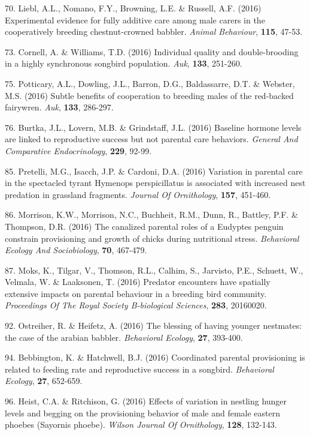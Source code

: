 70. Liebl, A.L., Nomano, F.Y., Browning, L.E. \&  Russell, A.F. (2016) Experimental evidence for fully additive care among male carers in the cooperatively breeding chestnut-crowned babbler. \textit{Animal Behaviour},  \textbf{115}, 47-53.

73. Cornell, A. \&  Williams, T.D. (2016) Individual quality and double-brooding in a highly synchronous songbird population. \textit{Auk},  \textbf{133}, 251-260.

75. Potticary, A.L., Dowling, J.L., Barron, D.G., Baldassarre, D.T. \&  Webster, M.S. (2016) Subtle benefits of cooperation to breeding males of the red-backed fairywren. \textit{Auk},  \textbf{133}, 286-297.

76. Burtka, J.L., Lovern, M.B. \&  Grindstaff, J.L. (2016) Baseline hormone levels are linked to reproductive success but not parental care behaviors. \textit{General And Comparative Endocrinology},  \textbf{229}, 92-99.

85. Pretelli, M.G., Isacch, J.P. \&  Cardoni, D.A. (2016) Variation in parental care in the spectacled tyrant Hymenops perspicillatus is associated with increased nest predation in grassland fragments. \textit{Journal Of Ornithology},  \textbf{157}, 451-460.

86. Morrison, K.W., Morrison, N.C., Buchheit, R.M., Dunn, R., Battley, P.F. \&  Thompson, D.R. (2016) The canalized parental roles of a Eudyptes penguin constrain provisioning and growth of chicks during nutritional stress. \textit{Behavioral Ecology And Sociobiology},  \textbf{70}, 467-479.

87. Moks, K., Tilgar, V., Thomson, R.L., Calhim, S., Jarvisto, P.E., Schuett, W., Velmala, W. \&  Laaksonen, T. (2016) Predator encounters have spatially extensive impacts on parental behaviour in a breeding bird community. \textit{Proceedings Of The Royal Society B-biological Sciences},  \textbf{283}, 20160020.

92. Ostreiher, R. \&  Heifetz, A. (2016) The blessing of having younger nestmates: the case of the arabian babbler. \textit{Behavioral Ecology},  \textbf{27}, 393-400.

94. Bebbington, K. \&  Hatchwell, B.J. (2016) Coordinated parental provisioning is related to feeding rate and reproductive success in a songbird. \textit{Behavioral Ecology},  \textbf{27}, 652-659.

96. Heist, C.A. \&  Ritchison, G. (2016) Effects of variation in nestling hunger levels and begging on the provisioning behavior of male and female eastern phoebes (Sayornis phoebe). \textit{Wilson Journal Of Ornithology},  \textbf{128}, 132-143.

